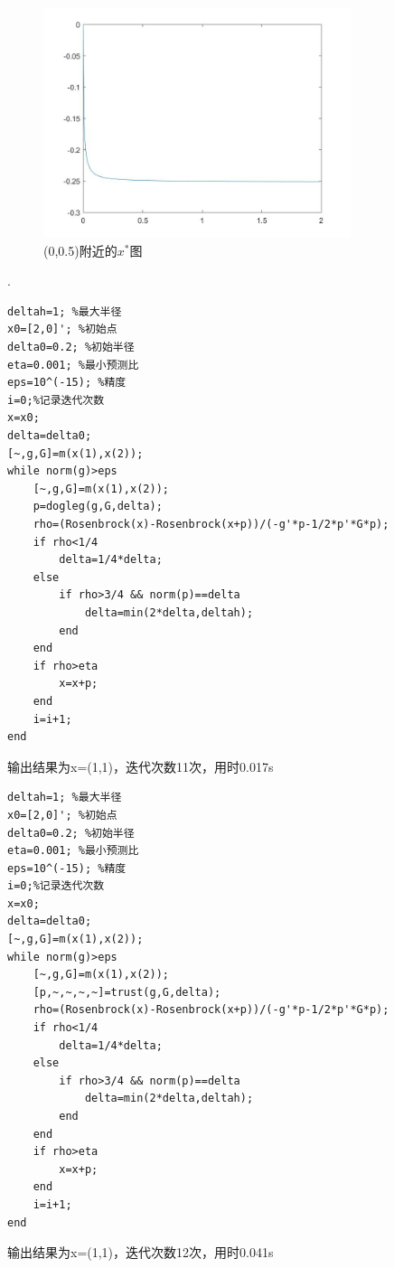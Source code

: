 \documentclass{article}
\begin{document}
\begin{figure}[htbp]
\begin{minipage}[t]{0.6\textwidth}
\centering
\includegraphics[width=9cm]{005x.jpg}
\caption{(0,0.5)附近的$x^*$图}
\end{minipage}
\end{figure}

.
\begin{lstlisting}
deltah=1; %最大半径
x0=[2,0]'; %初始点
delta0=0.2; %初始半径
eta=0.001; %最小预测比
eps=10^(-15); %精度
i=0;%记录迭代次数
x=x0;
delta=delta0;
[~,g,G]=m(x(1),x(2));
while norm(g)>eps
    [~,g,G]=m(x(1),x(2));
    p=dogleg(g,G,delta);
    rho=(Rosenbrock(x)-Rosenbrock(x+p))/(-g'*p-1/2*p'*G*p);
    if rho<1/4
        delta=1/4*delta;
    else
        if rho>3/4 && norm(p)==delta
            delta=min(2*delta,deltah);
        end
    end
    if rho>eta
        x=x+p;
    end
    i=i+1;
end
\end{lstlisting}
输出结果为x=(1,1)，迭代次数11次，用时0.017s

\clearpage
\begin{lstlisting}
deltah=1; %最大半径
x0=[2,0]'; %初始点
delta0=0.2; %初始半径
eta=0.001; %最小预测比
eps=10^(-15); %精度
i=0;%记录迭代次数
x=x0;
delta=delta0;
[~,g,G]=m(x(1),x(2));
while norm(g)>eps
    [~,g,G]=m(x(1),x(2));
    [p,~,~,~,~]=trust(g,G,delta);
    rho=(Rosenbrock(x)-Rosenbrock(x+p))/(-g'*p-1/2*p'*G*p);
    if rho<1/4
        delta=1/4*delta;
    else
        if rho>3/4 && norm(p)==delta
            delta=min(2*delta,deltah);
        end
    end
    if rho>eta
        x=x+p;
    end
    i=i+1;
end
\end{lstlisting}
输出结果为x=(1,1)，迭代次数12次，用时0.041s
\end{document}
